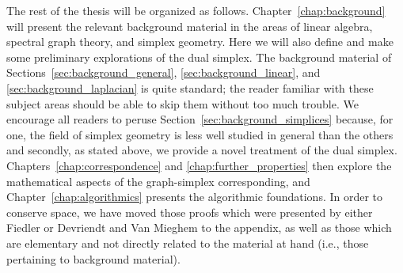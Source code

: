The rest of the thesis will be  organized as follows. Chapter~\ref{chap:background} will present the relevant background material in the areas of linear algebra, spectral graph theory, and simplex  geometry. Here we will also define and make some preliminary explorations of the dual simplex. The  background material  of Sections~\ref{sec:background_general}, \ref{sec:background_linear},  and \ref{sec:background_laplacian} is quite standard; the reader familiar with  these subject areas should  be able to skip  them without too much trouble. We  encourage all readers to peruse Section~\ref{sec:background_simplices} because, for one, the field  of simplex geometry is  less  well  studied  in general than the others and secondly, as stated above, we provide a novel treatment of  the dual simplex. Chapters~\ref{chap:correspondence} and \ref{chap:further_properties} then explore the mathematical aspects  of  the graph-simplex corresponding, and Chapter~\ref{chap:algorithmics} presents the algorithmic foundations. In order  to conserve  space, we have moved those proofs which were   presented by either Fiedler or Devriendt and Van Mieghem to the appendix, as well as those which are elementary and not directly related to the material at  hand (i.e., those pertaining  to background material). 









     

  	
